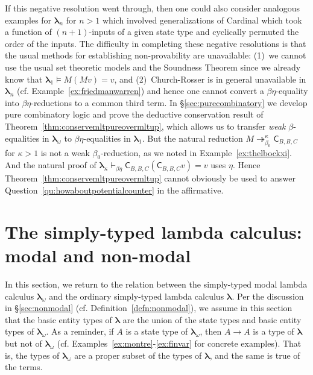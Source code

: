 \documentclass{lmcs} %
\newcommand{\mlt}[1]{\boldsymbol\lambda_{#1}}
\newcommand{\mltpure}{\mlt{\omega}}
\newcommand{\lt}{\boldsymbol\lambda}
\newcommand{\transreduces}[2]{\twoheadrightarrow_{#1}^{#2}}
\newcommand{\ctC}[6]{{\mathsf C}_{#1, #2, #3}#4#5#6}
\begin{document}
\noindent If this negative resolution went through, then one could also consider analogous examples for $\mlt{n}$ for $n>1$ which involved generalizations of Cardinal which took a function of $(n+1)$-inputs of a given state type and cyclically permuted the order of the inputs. The difficulty in completing these negative resolutions is that the usual methods for establishing non-provability are unavailable: (1)~we cannot use the usual set theoretic models and the Soundness Theorem since we already know that $\mlt{1}\models M (M v) =v$, and (2)~Church-Rosser is in general unavailable in $\mlt{n}$ (cf. Example~\ref{ex:friedmanwarren}) and hence one cannot convert a $\beta\eta$-equality into $\beta\eta$-reductions to a common third term. In \S\ref{sec:purecombinatory} we develop pure combinatory logic and prove the deductive conservation result of Theorem~\ref{thm:conservemltpureovermltup}, which allows us to transfer \emph{weak} $\beta$-equalities in $\mltpure$ to $\beta\eta$-equalities in $\mlt{1}$. But the natural reduction $M\transreduces{\beta_0}{\kappa}  \ctC{B}{B}{C}{}{}{}$ for $\kappa>1$ is not a weak $\beta_0$-reduction, as we noted in Example~\ref{ex:thelbockxi}. And the natural proof of $\mlt{\kappa}\vdash_{\beta\eta} \ctC{B}{B}{C}{}{}{} (\ctC{B}{B}{C}{}{}{} v) =v$ uses $\eta$. Hence Theorem~\ref{thm:conservemltpureovermltup} cannot obviously be used to answer Question~\ref{qu:howaboutpotentialcounter} in the affirmative.


\section{The simply-typed lambda calculus: modal and non-modal}\label{sec:ty2}

In this section, we return to the relation between the simply-typed modal lambda calculus $\mltpure$ and the ordinary simply-typed lambda calculus $\lt$. Per the discussion in \S\ref{sec:nonmodal} (cf. Definition~\ref{defn:nonmodal}), we assume in this section that the basic entity types of $\lt$ are the union of the state types and basic entity types of $\mltpure$. As a reminder, if $A$ is a state type of $\mltpure$, then $A\rightarrow A$ is a type of $\lt$ but not of $\mltpure$ (cf. Examples~\ref{ex:montre}-\ref{ex:finvar} for concrete examples). That is, the types of $\mltpure$ are a proper subset of the types of $\lt$, and the same is true of the terms.
\end{document}
